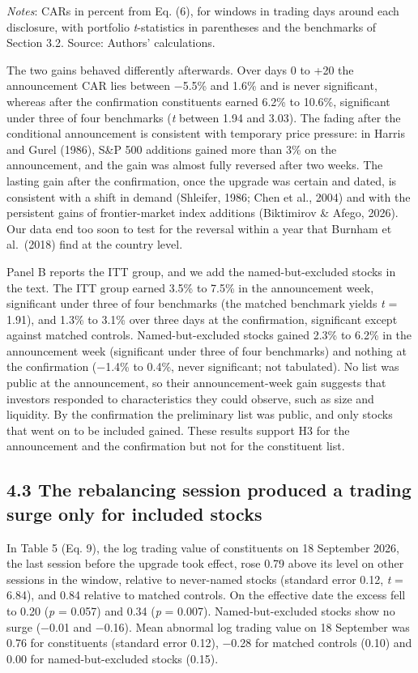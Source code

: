 \documentclass[review,authoryear,12pt]{elsarticle}
\begin{document}
\emph{Notes}: CARs in percent from Eq. (6), for windows in trading days
around each disclosure, with portfolio \emph{t}-statistics in
parentheses and the benchmarks of Section 3.2. Source: Authors'
calculations.

The two gains behaved differently afterwards. Over days 0 to +20 the
announcement CAR lies between −5.5\% and 1.6\% and is never significant,
whereas after the confirmation constituents earned 6.2\% to 10.6\%,
significant under three of four benchmarks (\emph{t} between 1.94 and
3.03). The fading after the conditional announcement is consistent with
temporary price pressure: in Harris and Gurel (1986), S\&P 500 additions
gained more than 3\% on the announcement, and the gain was almost fully
reversed after two weeks. The lasting gain after the confirmation, once
the upgrade was certain and dated, is consistent with a shift in demand
(Shleifer, 1986; Chen et al., 2004) and with the persistent gains of
frontier-market index additions (Biktimirov \& Afego, 2026). Our data
end too soon to test for the reversal within a year that Burnham et
al.~(2018) find at the country level.

Panel B reports the ITT group, and we add the named-but-excluded stocks
in the text. The ITT group earned 3.5\% to 7.5\% in the announcement
week, significant under three of four benchmarks (the matched benchmark
yields \emph{t} = 1.91), and 1.3\% to 3.1\% over three days at the
confirmation, significant except against matched controls.
Named-but-excluded stocks gained 2.3\% to 6.2\% in the announcement week
(significant under three of four benchmarks) and nothing at the
confirmation (−1.4\% to 0.4\%, never significant; not tabulated). No
list was public at the announcement, so their announcement-week gain
suggests that investors responded to characteristics they could observe,
such as size and liquidity. By the confirmation the preliminary list was
public, and only stocks that went on to be included gained. These
results support H3 for the announcement and the confirmation but not for
the constituent list.

\hypertarget{the-rebalancing-session-produced-a-trading-surge-only-for-included-stocks}{%
\subsection*{4.3 The rebalancing session produced a trading surge only
for included
stocks}}

In Table 5 (Eq. 9), the log trading value of constituents on 18
September 2026, the last session before the upgrade took effect, rose
0.79 above its level on other sessions in the window, relative to
never-named stocks (standard error 0.12, \emph{t} = 6.84), and 0.84
relative to matched controls. On the effective date the excess fell to
0.20 (\emph{p} = 0.057) and 0.34 (\emph{p} = 0.007). Named-but-excluded
stocks show no surge (−0.01 and −0.16). Mean abnormal log trading value
on 18 September was 0.76 for constituents (standard error 0.12), −0.28
for matched controls (0.10) and 0.00 for named-but-excluded stocks
(0.15).
\end{document}

